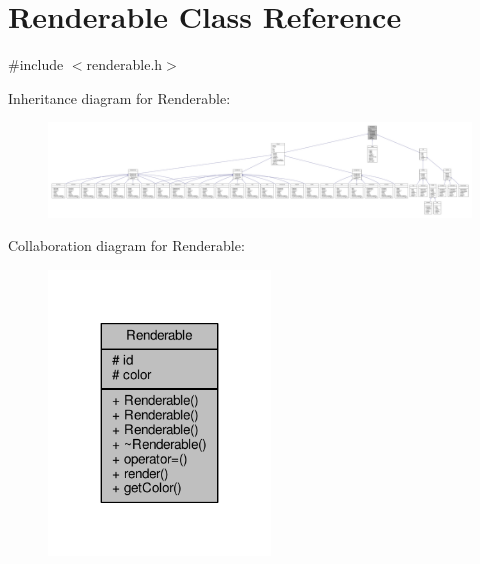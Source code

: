 \hypertarget{classRenderable}{}\section{Renderable Class Reference}
\label{classRenderable}


{\ttfamily \#include $<$renderable.\+h$>$}



Inheritance diagram for Renderable\+:
\nopagebreak
\begin{figure}[H]
\begin{center}
\leavevmode
\includegraphics[width=350pt]{classRenderable__inherit__graph}
\end{center}
\end{figure}


Collaboration diagram for Renderable\+:
\nopagebreak
\begin{figure}[H]
\begin{center}
\leavevmode
\includegraphics[width=167pt]{classRenderable__coll__graph}
\end{center}
\end{figure}
